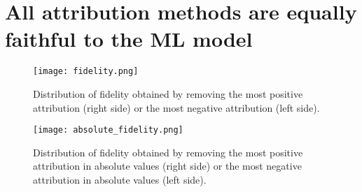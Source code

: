 \section{All attribution methods are equally faithful to the ML model}

\begin{figure}[h]
    \centering
    \texttt{[image: fidelity.png]}
    \caption{Distribution of fidelity obtained by removing the most positive 
        attribution (right side) or the most negative attribution (left side).
    }
    \label{fig:fidelity}
\end{figure}


\begin{figure}[h]
    \centering
    \texttt{[image: absolute\_fidelity.png]}
    \caption{Distribution of fidelity obtained by removing the most positive 
        attribution in absolute values (right side) or the most negative 
        attribution in absolute values (left side).
    }
    \label{fig:fidelity}
\end{figure}

